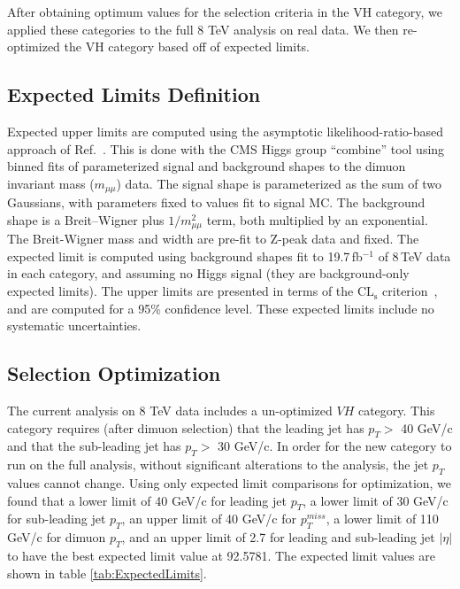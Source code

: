 \documentclass[12pt]{article}
\begin{document}
After obtaining optimum values for the selection criteria in the VH category, we applied these categories to the full 8 TeV analysis on real data. 
We then re-optimized the VH category based off of expected limits. 

\subsection{Expected Limits Definition}

Expected upper limits are computed using the asymptotic likelihood-ratio-based approach of 
Ref.~\cite{stats}.  This is done with the CMS Higgs group ``combine'' tool using binned
fits of parameterized signal and background shapes to the dimuon invariant mass 
($m_{\mu\mu}$) data.  The signal shape is parameterized
as the sum of two Gaussians, with parameters fixed to values fit to signal MC.
The background shape is a Breit--Wigner plus $1/m_{\mu\mu}^2$ term, both multiplied
by an exponential.  The Breit-Wigner mass and width are pre-fit to Z-peak data and fixed.
The expected limit is computed
using background shapes fit to 19.7\,fb$^{-1}$ of 8\,TeV data in each category,
and assuming no Higgs signal (they are background-only expected limits).  The upper
limits are presented in terms of the $\mathrm{CL_s}$ criterion~\cite{cls}, and are computed for 
a 95\% confidence level.  These expected limits include no systematic uncertainties.

\subsection{Selection Optimization}

The current analysis on 8 TeV data includes a un-optimized $VH$ category. This category requires (after dimuon selection) 
that the leading jet has $p_{T} >$ 40 GeV/c and that the sub-leading jet has $p_{T} >$ 30 GeV/c. In order for the new category to run
on the full analysis, without significant alterations to the analysis, the jet $p_{T}$ values cannot change. Using only expected limit comparisons for 
optimization, we found that a lower limit of 40 GeV/c for leading jet $p_{T}$, a lower limit of 30 GeV/c for sub-leading jet $p_{T}$, an upper 
limit of 40 GeV/c for $p_{T}^{miss}$, a lower limit of 110 GeV/c for dimuon $p_{T}$, and an upper limit of 2.7 for leading and sub-leading 
jet $|\eta|$ to have the best expected limit value at 92.5781. The expected limit values are shown in table \ref{tab:ExpectedLimits}.
\end{document}
